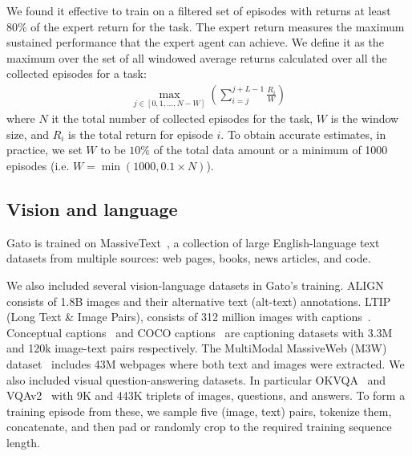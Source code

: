 \documentclass[10pt]{article} \usepackage[accepted]{tmlr}
\newcommand{\model}{{Gato}}
\begin{document}
We found it effective to train on a filtered set of episodes with returns at least 80\% of the expert return for the task.
The expert return measures the maximum sustained performance that the expert agent can achieve.
We define it as the maximum over the set of all windowed average returns calculated over all the collected episodes for a task:
\begin{align*}
\label{eq:expert-return}
    \max_{j \in [0, 1, ..., N - W]} \left( \sum_{i=j}^{j+L-1} \frac{R_i}{W} \right)
\end{align*}
where $N$ it the total number of collected episodes for the task, $W$ is the window size, and $R_i$ is the total return for episode $i$.
To obtain accurate estimates, in practice, we set $W$ to be $10 \%$ of the total data amount or a minimum of 1000 episodes (i.e. $W = \min(1000, 0.1 \times N)$).
\vskip 0.4cm
\subsection{Vision and language}
\label{sec:vision-and-language}
\vskip 0.2cm
\model{} is trained on MassiveText~\citep{rae2021scaling}, a collection of large English-language text datasets from multiple sources: web pages, books, news articles, and code.


We also included several vision-language datasets in \model{}'s training.
ALIGN~\citep{jia2021scaling} consists of 1.8B images and their alternative text (alt-text) annotations. 
LTIP (Long Text \& Image Pairs), consists of 312 million images with captions~\citep{Alayrac2022FlamingoAV}.
Conceptual captions~\citep{sharma-etal-2018-conceptual} and COCO captions~\citep{chen2015microsoft} are captioning datasets with 3.3M and 120k image-text pairs respectively.
The MultiModal MassiveWeb (M3W) dataset~\citep{Alayrac2022FlamingoAV} includes 43M webpages where both text and images were extracted. 
We also included visual question-answering datasets. In particular OKVQA~\citep{marino2019ok} and VQAv2~\citep{antol2015vqa}
with 9K and 443K triplets of images, questions, and answers.
To form a training episode from these, we sample five (image, text) pairs, tokenize them, concatenate, and then pad or randomly crop to the required training sequence length.
\vskip 0.4cm
\end{document}
